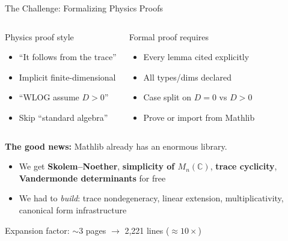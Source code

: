 \documentclass[aspectratio=169,10pt]{beamer}
\begin{document}
\begin{frame}{The Challenge: Formalizing Physics Proofs}
\begin{columns}[T]
\begin{block}{\textcolor{softred}{Physics proof style}}
\begin{itemize}
\item ``It follows from the trace''
\item Implicit finite-dimensional
\item ``WLOG assume $D>0$''
\item Skip ``standard algebra''
\end{itemize}
\end{block}

\begin{block}{\textcolor{leangreen}{Formal proof requires}}
\begin{itemize}
\item Every lemma cited explicitly
\item All types/dims declared
\item Case split on $D=0$ vs $D>0$
\item Prove or import from Mathlib
\end{itemize}
\end{block}
\end{columns}

\vspace{0.6em}
\textbf{The good news:} Mathlib already has an enormous library.
\begin{itemize}
  \item We get \textbf{Skolem--Noether}, \textbf{simplicity of $M_n(\mathbb{C})$}, \textbf{trace cyclicity}, \textbf{Vandermonde determinants} for free
  \item We had to \emph{build}: trace nondegeneracy, linear extension, multiplicativity, canonical form infrastructure
\end{itemize}

\vspace{0.3em}
Expansion factor: $\sim$3 pages $\to$ 2,221 lines ($\approx 10\times$)
\end{frame}
\end{document}
